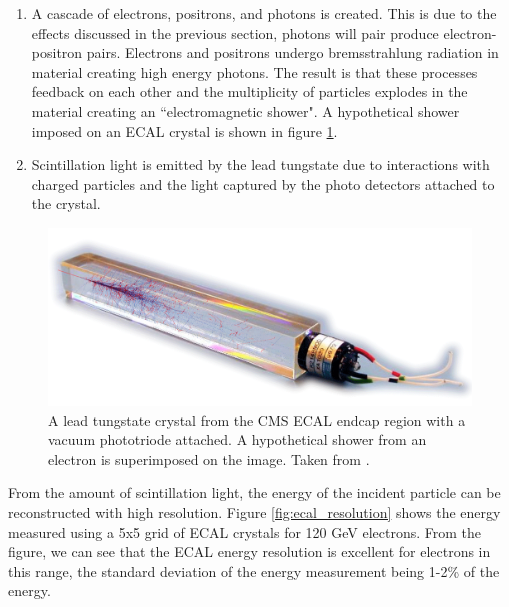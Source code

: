     \begin{enumerate}
      \item A cascade of electrons, positrons, and photons is created. This is due to the effects discussed in the previous section, photons will pair produce electron-positron pairs. Electrons and positrons undergo bremsstrahlung radiation in material creating high energy photons. The result is that these processes feedback on each other and the multiplicity of particles explodes in the material creating an ``electromagnetic shower". A hypothetical shower imposed on an ECAL crystal is shown in figure \ref{fig:ecal_crystal}.

      \item Scintillation light is emitted by the lead tungstate due to interactions with charged particles and the light captured by the photo detectors attached to the crystal.
    \end{enumerate}

    \begin{figure}[h!]
      \centering
      \includegraphics[width=.5\textwidth]{figures/cms_ecal_crystal_shower.png}
      \caption{A lead tungstate crystal from the CMS ECAL endcap region with a vacuum phototriode attached. A hypothetical shower from an electron is superimposed on the image. Taken from \cite{ecal_crystal}.}
      \label{fig:ecal_crystal}
    \end{figure}

    From the amount of scintillation light, the energy of the incident particle can be reconstructed with high resolution. Figure \ref{fig:ecal_resolution} shows the energy measured using a 5x5 grid of ECAL crystals for 120 GeV electrons. From the figure, we can see that the ECAL energy resolution is excellent for electrons in this range, the standard deviation of the energy measurement being 1-2\% of the energy.

